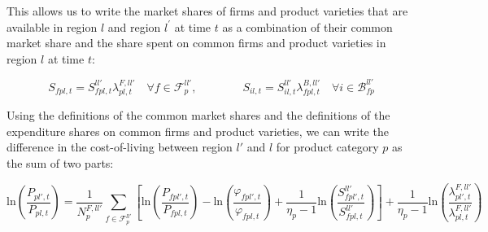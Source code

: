 \noindent This allows us to write the market shares of firms and product varieties that are available in region $l$ and region $l^{'}$ at time $t$ as a combination of their common market share and the share spent on common firms and product varieties in region $l$ at time $t$: 
\begin{linenomath*}
    \begin{equation*}
        S_{fpl,t} = S^{ll'}_{fpl,t} \lambda^{F,ll'}_{pl,t}
            \quad \forall f \in \mathcal{F}^{ll'}_{p}, \qquad \qquad 
        S_{il,t}  = S^{ll'}_{il,t} \lambda^{B,ll'}_{fpl,t}
            \quad \forall i \in \mathcal{B}^{ll'}_{fp}
    \end{equation*}
\end{linenomath*}

Using the definitions of the common market shares and the definitions of the expenditure shares on common firms and product varieties, we can write the difference in the cost-of-living between region $l'$ and $l$ for product category $p$ as the sum of two parts: 
\begin{linenomath*}
    \begin{equation*}
        \text{ln}\left(\frac{P_{pl',t}}{P_{pl,t}}\right)
            =   \frac{1}{N^{F,ll'}_{p}}
                \sum_{f \in \mathcal{F}^{ll'}_{p}} 
                \left[
                    \text{ln}\left(\frac{P_{fpl',t}}{P_{fpl,t}}\right)
                        -   \text{ln}\left(\frac{\varphi_{fpl',t}}{\varphi_{fpl,t}}\right)
                        +   \frac{1}{\eta_p-1}\text{ln}
                            \left(
                                \frac{S^{ll'}_{fpl',t}}{S^{ll'}_{fpl,t}}
                            \right)
                \right]
                + \frac{1}{\eta_p-1}
                    \text{ln}
                    \left(
                        \frac{\lambda^{F,ll'}_{pl',t}}{\lambda^{F,ll'}_{pl,t}}
                    \right)
    \end{equation*}
\end{linenomath*}
